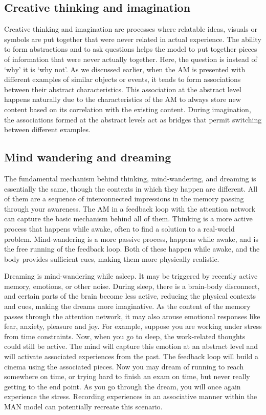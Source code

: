 \documentclass[reprint,amsmath,amssymb,apr,aip,onecolumn, 11pt]{revtex4-1}
\begin{document}
\subsection{Creative thinking and imagination}
Creative thinking and imagination are processes where relatable ideas, visuals or symbols are put together that were never related in actual experience. The ability to form abstractions and to ask questions helps the model to put together pieces of information that were never actually together. Here, the question is instead of `why' it is `why not'. As we discussed earlier, when the AM is presented with different examples of similar objects or events, it tends to form associations between their abstract characteristics. This association at the abstract level happens naturally due to the characteristics of the AM to always store new content based on its correlation with the existing content. During imagination, the associations formed at the abstract levels act as bridges that permit switching between different examples. 


\subsection{Mind wandering and dreaming}


The fundamental mechanism behind thinking, mind-wandering, and dreaming is essentially the same, though the contexts in which they happen are different. All of them are a sequence of interconnected impressions in the memory passing through your awareness. The AM in a feedback loop with the attention network can capture the basic mechanism behind all of them.  Thinking is a more active process that happens while awake, often to find a solution to a real-world problem. Mind-wandering is a more passive process, happens while awake, and is the free running of the feedback loop. Both of these happen while awake, and the body provides sufficient cues, making them more physically realistic. 

Dreaming is mind-wandering while asleep. It may be triggered by recently active memory, emotions, or other noise. During sleep, there is a brain-body disconnect\cite{Jones_2018}, and certain parts of the brain become less active, reducing the physical contexts and cues, making the dreams more imaginative. As the content of the memory passes through the attention network, it may also arouse emotional responses like fear, anxiety, pleasure and joy. For example, suppose you are working under stress from time constraints. Now, when you go to sleep, the work-related thoughts could still be active. The mind will capture this emotion at an abstract level and will activate associated experiences from the past. The feedback loop will build a cinema using the associated pieces. Now you may dream of running to reach somewhere on time, or trying hard to finish an exam on time, but never really getting to the end point. As you go through the dream, you will once again experience the stress. Recording experiences in an associative manner within the MAN model can potentially recreate this scenario. 
\end{document}
